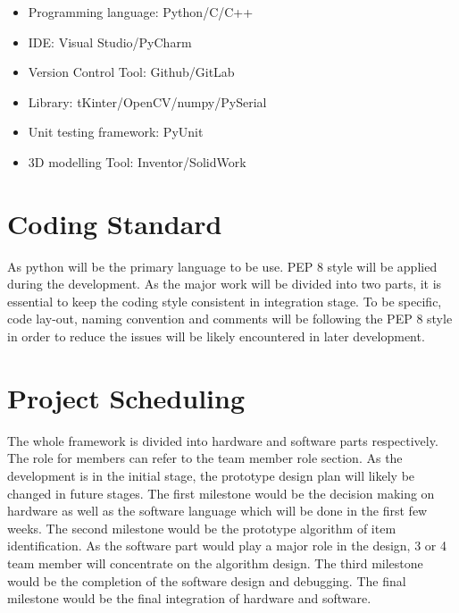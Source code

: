 \documentclass{article}
\begin{document}
\begin{large}
\begin{itemize}
\item Programming language: Python/C/C++
\item IDE: Visual Studio/PyCharm
\item Version Control Tool: Github/GitLab
\item Library: tKinter/OpenCV/numpy/PySerial
\item Unit testing framework: PyUnit
\item 3D modelling Tool: Inventor/SolidWork

\end{itemize}

\section{Coding Standard}
\hspace*{0.5cm} As python will be the primary language to be use. PEP 8 style will be applied during the development. As the major work will be divided into two parts, it is essential to keep the coding style consistent in integration stage. To be specific, code lay-out, naming convention and comments will be following the PEP 8 style in order to reduce the issues will be likely encountered in later development.
\section{Project Scheduling}
\hspace*{1cm} The whole framework is divided into hardware and software parts respectively. The role for members can refer to the team member role section. As the development is in the initial stage, the prototype design plan will likely be changed in future stages. The first milestone would be the decision making on hardware as well as the software language which will be done in the first few weeks. The second milestone would be the prototype algorithm of item identification. As the software part would play a major role in the design, 3 or 4 team member will concentrate on the algorithm design. The third milestone would be the completion of the software design and debugging. The final milestone would be the final integration of hardware and software.
\end{large}
\end{document}
